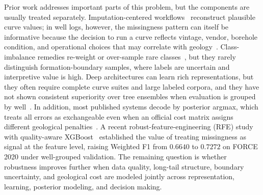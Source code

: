 \documentclass[bdcc,article,submit,pdftex,moreauthors]{Definitions/mdpi}
\begin{document}
Prior work addresses important parts of this problem, but the components are usually treated
separately. Imputation-centered workflows~\cite{vanbuuren2011mice,stekhoven2012missforest,liu2025wellgan,xie2024cgan}
reconstruct plausible curve values; in well logs, however, the missingness pattern can itself
be informative because the decision to run a curve reflects vintage, vendor, borehole
condition, and operational choices that may correlate with geology~\cite{chen2026rfe,little2019stats,josse2024missing}.
Class-imbalance remedies re-weight or over-sample rare
classes~\cite{chawla2002smote,lin2017focal,cui2019classbalanced,he2024imbalanced}, but they
rarely distinguish formation-boundary samples, where labels are uncertain and interpretive
value is high. Deep architectures can learn rich representations, but they often require
complete curve suites and large labeled corpora, and they have not shown consistent superiority
over tree ensembles when evaluation is grouped by
well~\cite{wang2024dnnlitho,grinsztajn2022trees,shwartzziv2022tabular,mcelfresh2024benchmark}.
In addition, most published systems decode by posterior argmax, which treats all errors as
exchangeable even when an official cost matrix assigns different geological penalties~\cite{elkan2001cost,berger1985decision}.
A recent robust-feature-engineering (RFE) study with quality-aware XGBoost~\cite{chen2026rfe}
established the value of treating missingness as signal at the feature level, raising Weighted
F1 from $0.6640$ to $0.7272$ on FORCE 2020 under well-grouped validation. The remaining
question is whether robustness improves further when data quality, long-tail structure,
boundary uncertainty, and geological cost are modeled jointly across representation, learning,
posterior modeling, and decision making.
\end{document}
